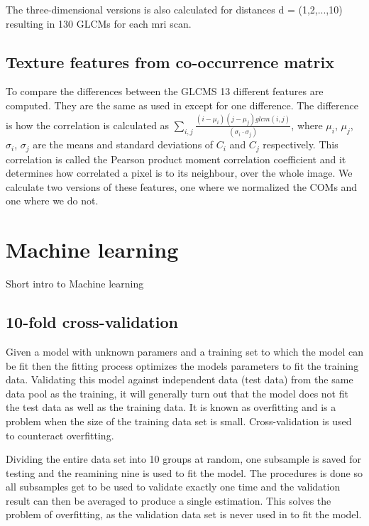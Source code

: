 The three-dimensional versions is also calculated for distances d = (1,2,...,10) resulting in 130 GLCMs for each mri scan.

\subsection{Texture features from co-occurrence matrix}
To compare the differences between the GLCMS 13 different features are computed. They are the same as used in \cite{MRfreeborough} except for one difference. The difference is how the correlation is calculated as $\sum_{i,j} \frac{(i-\mu_i)(j-\mu_j)glcm(i,j)}{(\sigma_i \cdot \sigma_j)}$, where $\mu_i$, $\mu_j$, $\sigma_i$, $\sigma_j$ are the means and standard deviations of $C_i$ and $C_j$ respectively. This correlation is called the Pearson product moment correlation coefficient and it determines how correlated a pixel is to its neighbour, over the whole image\cite{graycoprops}\cite{Pearson}. We calculate two versions of these features, one where we normalized the COMs and one where we do not.


\section{Machine learning}
Short intro to Machine learning

\subsection{10-fold cross-validation}
Given a model with unknown paramers and a training set to which the model can be fit then the fitting process optimizes the models parameters to fit the training data. Validating this model against independent data (test data) from the same data pool as the training, it will generally turn out that the model does not fit the test data as well as the training data. It is known as overfitting and is a problem when the size of the training data set is small. Cross-validation is used to counteract overfitting.

Dividing the entire data set into 10 groups at random, one subsample is saved for testing and the reamining nine is used to fit the model. The procedures is done so all subsamples get to be used to validate exactly one time and the validation result can then be averaged to produce a single estimation. This solves the problem of overfitting, as the validation data set is never used in to fit the model.


